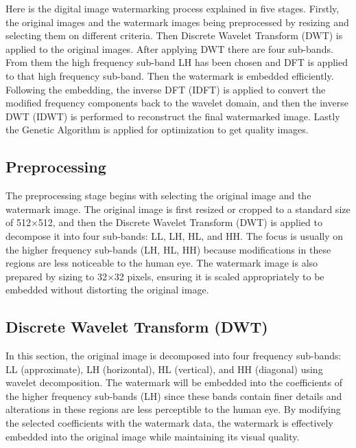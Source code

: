 Here is the digital image watermarking process explained in five stages. Firstly, the original images and the watermark images being preprocessed by resizing and selecting them on different criteria. Then Discrete Wavelet Transform (DWT) is applied to the original images. After applying DWT there are four sub-bands. From them the high frequency sub-band LH has been chosen and DFT is applied to that high frequency sub-band. Then the watermark is embedded efficiently. Following the embedding, the inverse DFT (IDFT) is applied to convert the modified frequency components back to the wavelet domain, and then the inverse DWT (IDWT) is performed to reconstruct the final watermarked image. Lastly the Genetic Algorithm is applied for optimization to get quality images.

\subsection{Preprocessing}

The preprocessing stage begins with selecting the original image and the watermark image. The original image is first resized or cropped to a standard size of 512$\times$512, and then the Discrete Wavelet Transform (DWT) is applied to decompose it into four sub-bands: LL, LH, HL, and HH. The focus is usually on the higher frequency sub-bands (LH, HL, HH) because modifications in these regions are less noticeable to the human eye. The watermark image is also prepared by sizing to 32$\times$32 pixels, ensuring it is scaled appropriately to be embedded without distorting the original image.

\subsection{Discrete Wavelet Transform (DWT)}

In this section, the original image is decomposed into four frequency sub-bands: LL (approximate), LH (horizontal), HL (vertical), and HH (diagonal) using wavelet decomposition. The watermark will be embedded into the coefficients of the higher frequency sub-bands (LH) since these bands contain finer details and alterations in these regions are less perceptible to the human eye. By modifying the selected coefficients with the watermark data, the watermark is effectively embedded into the original image while maintaining its visual quality.


